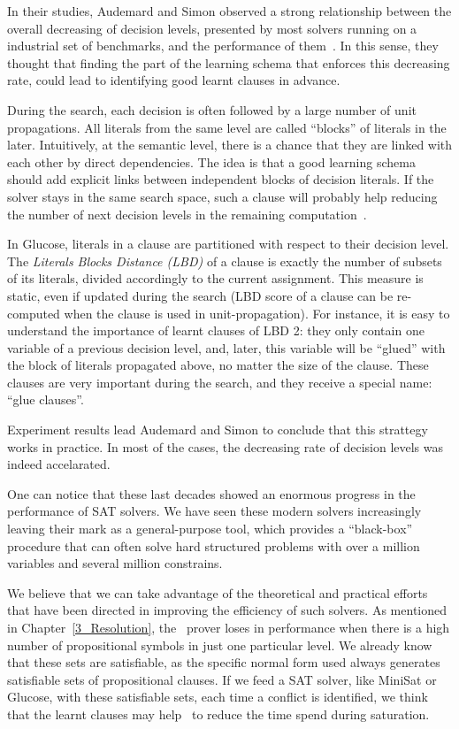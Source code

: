 In their studies, Audemard and Simon observed a strong relationship between the
overall decreasing of decision levels, presented by most solvers running on a
industrial set of benchmarks, and the performance of
them~\cite{audemard2009predicting}.  In this sense, they thought that finding
the part of the learning schema that enforces this decreasing rate, could lead
to identifying good learnt clauses in advance.

During the search, each decision is often followed by a large number of unit
propagations. All literals from the same level are called ``blocks'' of literals
in the later. Intuitively, at the semantic level, there is a chance that they
are linked with each other by direct dependencies. The idea is that a good
learning schema should add explicit links between independent blocks of decision
literals. If the solver stays in the same search space, such a clause will
probably help reducing the number of next decision levels in the remaining
computation~\cite{audemard2009predicting}.

In Glucose, literals in a clause are partitioned with respect to their decision
level. The \emph{Literals Blocks Distance (LBD)} of a clause is exactly the
number of subsets of its literals, divided accordingly to the current
assignment. This measure is static, even if updated during the search (LBD score
of a clause can be re-computed when the clause is used in unit-propagation). For
instance, it is easy to understand the importance of learnt clauses of LBD 2:
they only contain one variable of a previous decision level, and, later, this
variable will be ``glued'' with the block of literals propagated above, no
matter the size of the clause. These clauses are very important during the
search, and they receive a special name: ``glue clauses''.

Experiment results lead Audemard and Simon to conclude that this strattegy
works in practice. In most of the cases, the decreasing rate of decision
levels was indeed accelarated.

One can notice that these last decades showed an enormous progress in the
performance of SAT solvers. We have seen these modern solvers increasingly
leaving their mark as a general-purpose tool, which provides a ``black-box''
procedure that can often solve hard structured problems with over a million
variables and several million constrains. 

We believe that we can take advantage of the theoretical and practical efforts
that have been directed in improving the efficiency of such solvers. As
mentioned in Chapter~\ref{3_Resolution}, the \ksp\ prover loses in performance
when there is a high number of propositional symbols in just one particular
level. We already know that these sets are satisfiable, as the specific normal
form used always generates satisfiable sets of propositional clauses. If we
feed a SAT solver, like MiniSat or Glucose, with these satisfiable sets, each
time a conflict is identified, we think that the learnt clauses may help \ksp\
to reduce the time spend during saturation.

